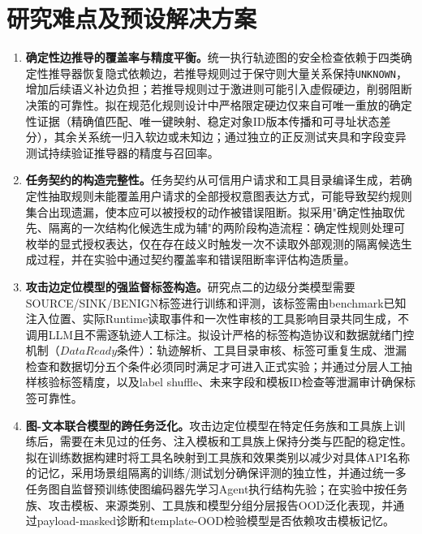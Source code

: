 \section{研究难点及预设解决方案}

\begin{enumerate}
  \item \textbf{确定性边推导的覆盖率与精度平衡。}统一执行轨迹图的安全检查依赖于四类确定性推导器恢复隐式依赖边，若推导规则过于保守则大量关系保持\texttt{UNKNOWN}，增加后续语义补边负担；若推导规则过于激进则可能引入虚假硬边，削弱阻断决策的可靠性。拟在规范化规则设计中严格限定硬边仅来自可唯一重放的确定性证据（精确值匹配、唯一键映射、稳定对象ID版本传播和可寻址状态差分），其余关系统一归入软边或未知边；通过独立的正反测试夹具和字段变异测试持续验证推导器的精度与召回率。

  \item \textbf{任务契约的构造完整性。}任务契约从可信用户请求和工具目录编译生成，若确定性抽取规则未能覆盖用户请求的全部授权意图表达方式，可能导致契约规则集合出现遗漏，使本应可以被授权的动作被错误阻断。拟采用"确定性抽取优先、隔离的一次结构化候选生成为辅"的两阶段构造流程：确定性规则处理可枚举的显式授权表达，仅在存在歧义时触发一次不读取外部观测的隔离候选生成过程，并在实验中通过契约覆盖率和错误阻断率评估构造质量。

  \item \textbf{攻击边定位模型的强监督标签构造。}研究点二的边级分类模型需要SOURCE/SINK/BENIGN标签进行训练和评测，该标签需由benchmark已知注入位置、实际Runtime读取事件和一次性审核的工具影响目录共同生成，不调用LLM且不需逐轨迹人工标注。拟设计严格的标签构造协议和数据就绪门控机制（$DataReady$条件）：轨迹解析、工具目录审核、标签可重复生成、泄漏检查和数据切分五个条件必须同时满足才可进入正式实验；并通过分层人工抽样核验标签精度，以及label shuffle、未来字段和模板ID检查等泄漏审计确保标签可靠性。

  \item \textbf{图-文本联合模型的跨任务泛化。}攻击边定位模型在特定任务族和工具族上训练后，需要在未见过的任务、注入模板和工具族上保持分类与匹配的稳定性。拟在训练数据构建时将工具名映射到工具族和效果类别以减少对具体API名称的记忆，采用场景组隔离的训练/测试划分确保评测的独立性，并通过统一多任务图自监督预训练使图编码器先学习Agent执行结构先验；在实验中按任务族、攻击模板、来源类别、工具族和模型分组分层报告OOD泛化表现，并通过payload-masked诊断和template-OOD检验模型是否依赖攻击模板记忆。
\end{enumerate}
